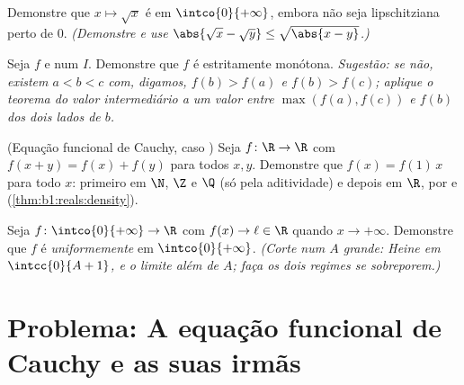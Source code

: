 \begin{exercise}[$\star\star$]\label{exo:b1:continuity:9}
Demonstre que $x \mapsto \sqrt x$ é  em
$\intco{0}{+\infty}$, embora não seja lipschitziana perto de $0$.
\emph{(Demonstre e use $\abs{\sqrt x - \sqrt y} \leq \sqrt{\abs{x -
y}}$.)}
\end{exercise}

\begin{exercise}[$\star\star\star$]\label{exo:b1:continuity:10}
Seja $f$  e  num  $I$. Demonstre que
$f$ é estritamente monótona. \emph{Sugestão: se não, existem $a < b < c$
com, digamos, $f(b) > f(a)$ e $f(b) > f(c)$; aplique o teorema do valor
intermediário a um valor entre $\max(f(a), f(c))$ e $f(b)$ dos
dois lados de $b$.}
\end{exercise}

\begin{exercise}[$\star\star\star$]\label{exo:b1:continuity:11}
(Equação funcional de Cauchy, caso ) Seja $f \colon \R \to
\R$  com $f(x + y) = f(x) + f(y)$ para todos $x, y$.
Demonstre que $f(x) = f(1)\,x$ para todo $x$: primeiro em $\N$, $\Z$ e $\Q$
(só pela aditividade) e depois em $\R$, por  e 
(\cref{thm:b1:reals:density}).
\end{exercise}

\begin{exercise}[$\star\star\star$]\label{exo:b1:continuity:12}
Seja $f \colon \intco{0}{+\infty} \to \R$  com
$f(x) \to \ell \in \R$ quando $x \to +\infty$. Demonstre que $f$ é
\emph{uniformemente}  em $\intco{0}{+\infty}$. \emph{(Corte num
$A$ grande: Heine em $\intcc{0}{A+1}$, e o limite além de $A$; faça os
dois regimes se sobreporem.)}
\end{exercise}

\section{Problema: A equação funcional de Cauchy e as suas irmãs}

